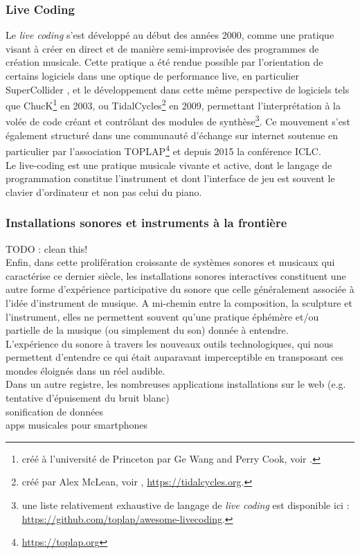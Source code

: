 \subsubsection{Live Coding}

\noindent Le \textit{live coding} s'est développé au début des années 2000, comme une pratique visant à créer en direct et de manière semi-improvisée des programmes de création musicale. Cette pratique a été rendue possible par l'orientation de certains logiciels dans une optique de performance live, en particulier SuperCollider \cite{mccartney_rethinking_2002}, et le développement dans cette même perspective de logiciels tels que ChucK\footnote{créé à l'université de Princeton par Ge Wang and Perry Cook, voir \cite{wang_chuck_2003}.} en 2003, ou TidalCycles\footnote{créé par Alex McLean, voir \cite{mclean_tidalpattern_2010}, \url{https://tidalcycles.org}.} en 2009, permettant l'interprétation à la volée de code créant et contrôlant des modules de synthèse\footnote{une liste relativement exhaustive de langage de \textit{live coding} est disponible ici : \url{https://github.com/toplap/awesome-livecoding}.}. Ce mouvement s'est également structuré dans une communauté d'échange sur internet soutenue en particulier par l'association TOPLAP\footnote{\url{https://toplap.org}} et depuis 2015 la conférence \gls{ICLC}.\\
\indent Le live-coding est une pratique musicale vivante et active, dont le langage de programmation constitue l'instrument \cite{blackwell_programming_2005} et dont l'interface de jeu est souvent le clavier d'ordinateur et non pas celui du piano.\\


\subsubsection{Installations sonores et instruments à la frontière}
TODO : clean this! \\
\noindent Enfin, dans cette prolifération croissante de systèmes sonores et musicaux qui caractérise ce dernier siècle, les installations sonores interactives constituent une autre forme d'expérience participative du sonore que celle généralement associée à l'idée d'instrument de musique. A mi-chemin entre la composition, la sculpture et l'instrument, elles ne permettent souvent qu'une pratique éphémère et/ou partielle de la musique (ou simplement du son) donnée à entendre.\\
\indent L'expérience du sonore à travers les nouveaux outils technologiques, qui nous permettent d'entendre ce qui était auparavant imperceptible en transposant ces mondes éloignés dans un réel audible.\\
\indent Dans un autre registre, les nombreuses applications
installations sur le web (e.g. tentative d'épuisement du bruit blanc)\\
sonification de données\\
apps musicales pour smartphones


